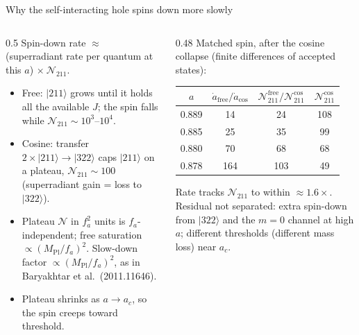 \documentclass[aspectratio=169,10pt]{beamer}
\newcommand{\ket}[1]{|#1\rangle}
\newcommand{\MPl}{M_{\mathrm{Pl}}}
\newcommand{\fa}{f_a}
\begin{document}
\begin{frame}{Why the self-interacting hole spins down more slowly}
  \begin{columns}[T]
    \begin{column}{0.5\textwidth}
      \small
      Spin-down rate $\approx$ (superradiant rate per quantum at this $a$) $\times\ \mathcal{N}_{211}$.
      \begin{itemize}
        \item Free: $\ket{211}$ grows until it holds all the available $J$; the spin falls while $\mathcal{N}_{211}\sim 10^3$--$10^4$.
        \item Cosine: transfer $2\times\ket{211}\to\ket{322}$ caps $\ket{211}$ on a plateau, $\mathcal{N}_{211}\sim 100$
              (superradiant gain = loss to $\ket{322}$).
        \item Plateau $\mathcal{N}$ in $\fa^2$ units is $\fa$-independent; free saturation $\propto (\MPl/\fa)^2$.
              Slow-down factor $\propto (\MPl/\fa)^2$, as in Baryakhtar et al.\ (2011.11646).
        \item Plateau shrinks as $a\to a_c$, so the spin creeps toward threshold.
      \end{itemize}
    \end{column}
    \begin{column}{0.48\textwidth}
      \footnotesize
      Matched spin, after the cosine collapse (finite differences of accepted states):

      \medskip
      \begin{tabular}{@{}cccc@{}}
        \toprule
        $a$ & $\dot a_{\mathrm{free}}/\dot a_{\cos}$ & $\mathcal{N}^{\mathrm{free}}_{211}/\mathcal{N}^{\cos}_{211}$ & $\mathcal{N}^{\cos}_{211}$ \\
        \midrule
        0.889 & 14  & 24  & 108 \\
        0.885 & 25  & 35  & 99 \\
        0.880 & 70  & 68  & 68 \\
        0.878 & 164 & 103 & 49 \\
        \bottomrule
      \end{tabular}

      \medskip
      Rate tracks $\mathcal{N}_{211}$ to within $\approx 1.6\times$.
      Residual not separated: extra spin-down from $\ket{322}$ and the $m=0$ channel at high $a$;
      different thresholds (different mass loss) near $a_c$.
    \end{column}
  \end{columns}
\end{frame}
\end{document}
